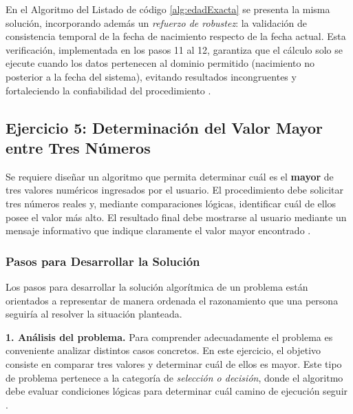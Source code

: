 \documentclass[12pt,twoside]{book}
\begin{document}
			En el Algoritmo del Listado de código \ref{alg:edadExacta} se presenta la misma solución, incorporando además un \emph{refuerzo de robustez}: la validación de consistencia temporal de la fecha de nacimiento respecto de la fecha actual. Esta verificación, implementada en los pasos 11 al 12, garantiza que el cálculo solo se ejecute cuando los datos pertenecen al dominio permitido (nacimiento no posterior a la fecha del sistema), evitando resultados incongruentes y fortaleciendo la confiabilidad del procedimiento \cite{Pressman2019Software,Sommerville2015Software}.
			
						\subsection{Ejercicio 5: Determinación del Valor Mayor entre Tres Números}
						
						\noindent
						Se requiere diseñar un algoritmo que permita determinar cuál es el \textbf{mayor} de tres valores numéricos ingresados por el usuario. El procedimiento debe solicitar tres números reales y, mediante comparaciones lógicas, identificar cuál de ellos posee el valor más alto. El resultado final debe mostrarse al usuario mediante un mensaje informativo que indique claramente el valor mayor encontrado \cite{Sebesta2018Concepts,Pierce2002Types}.
						
						\subsubsection{Pasos para Desarrollar la Solución}
						
						Los pasos para desarrollar la solución algorítmica de un problema están orientados a representar de manera ordenada el razonamiento que una persona seguiría al resolver la situación planteada.
						
						\noindent
						\textbf{1. Análisis del problema.}
						Para comprender adecuadamente el problema es conveniente analizar distintos casos concretos. En este ejercicio, el objetivo consiste en comparar tres valores y determinar cuál de ellos es mayor. Este tipo de problema pertenece a la categoría de \emph{selección o decisión}, donde el algoritmo debe evaluar condiciones lógicas para determinar cuál camino de ejecución seguir \cite{Qian2018Students,Robins2003Learning,Lister2004Learning}.
						
\end{document}
